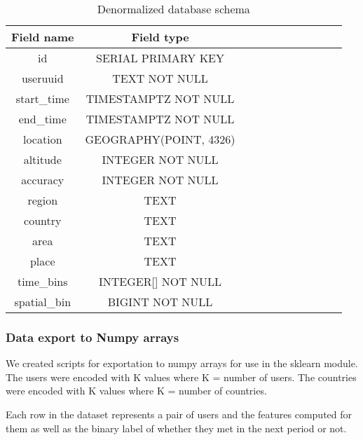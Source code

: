 \begin{table}[htbp]
\centering

\begin{tabular}{|c|c|c|c|c|c|c|c|c|c|c|}
\hline
\textbf{Field name} & \textbf{Field type}    \\
\hline
id                  & SERIAL PRIMARY KEY     \\
\hline
useruuid            & TEXT NOT NULL          \\
\hline
start\_time         & TIMESTAMPTZ NOT NULL   \\
\hline
end\_time           & TIMESTAMPTZ NOT NULL   \\
\hline
location            & GEOGRAPHY(POINT, 4326) \\
\hline
altitude            & INTEGER NOT NULL       \\
\hline
accuracy            & INTEGER NOT NULL       \\
\hline
region              & TEXT                   \\
\hline
country             & TEXT                   \\
\hline
area                & TEXT                   \\
\hline
place               & TEXT                   \\
\hline
time\_bins          & INTEGER{[}{]} NOT NULL \\
\hline
spatial\_bin        & BIGINT NOT NULL        \\
\hline
\end{tabular}
\caption{Denormalized database schema}
\label{table:schema_denormalized}
\end{table}
\subsubsection{Data export to Numpy arrays}
We created scripts for exportation to numpy arrays for use in the sklearn module. The users were encoded with K values where K = number of users. The countries were encoded with K values where K = number of countries.

Each row in the dataset represents a pair of users and the features computed for them as well as the binary label of whether they met in the next period or not.

